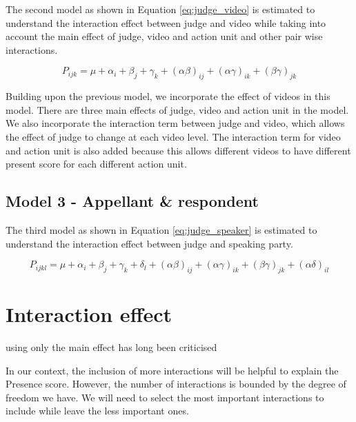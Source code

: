 \documentclass{monashthesis}
\begin{document}
The second model as shown in Equation \ref{eq:judge_video} is estimated to understand the interaction effect between judge and video while taking into account the main effect of judge, video and action unit and other pair wise interactions.

\begin{equation}\label{eq:judge_video}
P_{ijk} = \mu + \alpha_i + \beta_j +\gamma_k + (\alpha\beta)_{ij} + (\alpha\gamma)_{ik} + (\beta\gamma)_{jk}
\end{equation}

Building upon the previous model, we incorporate the effect of videos in this model. There are three main effects of judge, video and action unit in the model. We also incorporate the interaction term between judge and video, which allows the effect of judge to change at each video level. The interaction term for video and action unit is also added because this allows different videos to have different present score for each different action unit.

\hypertarget{model-3---appellant-respondent}{%
\subsection{Model 3 - Appellant \& respondent}\label{model-3---appellant-respondent}}

The third model as shown in Equation \ref{eq:judge_speaker} is estimated to understand the interaction effect between judge and speaking party.

\begin{equation}\label{eq:judge_speaker}
P_{ijkl} = \mu + \alpha_i + \beta_j +\gamma_k + \delta_l + (\alpha\beta)_{ij} + (\alpha\gamma)_{ik} + (\beta\gamma)_{jk} + (\alpha\delta)_{il}
\end{equation}

\hypertarget{interaction-effect}{%
\section{Interaction effect}\label{interaction-effect}}

using only the main effect has long been criticised \autocite[\textcite{meyer1991misinterpretation}, \textcite{ottenbacher1991interpretation}]{martinez2015analysing}

In our context, the inclusion of more interactions will be helpful to explain the Presence score. However, the number of interactions is bounded by the degree of freedom we have. We will need to select the most important interactions to include while leave the less important ones.
\end{document}
